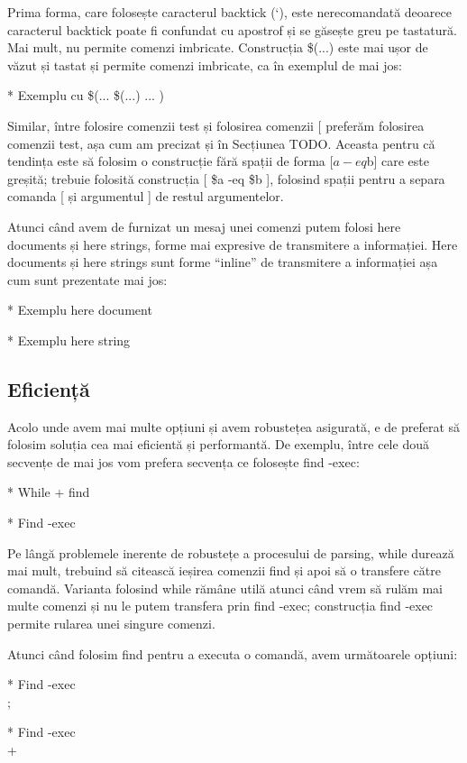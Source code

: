 Prima forma, care folosește caracterul backtick (`), este nerecomandată deoarece
caracterul backtick poate fi confundat cu apostrof și se găsește greu pe
tastatură. Mai mult, nu permite comenzi imbricate. Construcția \$(...) este mai
ușor de văzut și tastat și permite comenzi imbricate, ca în exemplul de mai jos:

* Exemplu cu \$(... \$(...) ... )

Similar, între folosire comenzii test și folosirea comenzii [ preferăm folosirea
comenzii test, așa cum am precizat și în Secțiunea TODO. Aceasta pentru că
tendința este să folosim o construcție fără spații de forma [$a -eq $b] care
este greșită; trebuie folosită construcția [ \$a -eq \$b ], folosind spații
pentru a separa comanda [ și argumentul ] de restul argumentelor.

Atunci când avem de furnizat un mesaj unei comenzi putem folosi here documents
și here strings, forme mai expresive de transmitere a informației. Here
documents și here strings sunt forme “inline” de transmitere a informației așa
cum sunt prezentate mai jos:

* Exemplu here document

* Exemplu here string

\subsection{Eficiență}
\label{sec:script-advancedfunc-efficiency}

Acolo unde avem mai multe opțiuni și avem robustețea asigurată, e de preferat să
folosim soluția cea mai eficientă și performantă. De exemplu, între cele două
secvențe de mai jos vom prefera secvența ce folosește find -exec:

* While + find

* Find -exec

Pe lângă problemele inerente de robustețe a procesului de parsing, while durează
mai mult, trebuind să citească ieșirea comenzii find și apoi să o transfere
către comandă. Varianta folosind while rămâne utilă atunci când vrem să rulăm
mai multe comenzi și nu le putem transfera prin find -exec; construcția find
-exec permite rularea unei singure comenzi.

Atunci când folosim find pentru a executa o comandă, avem următoarele opțiuni:

* Find -exec \\;

* Find -exec \\+

